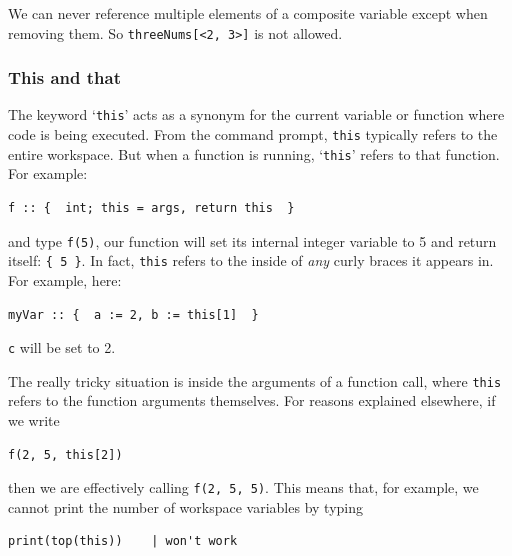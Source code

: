 \documentclass{article}
\newenvironment{code}{
       \begin{list}{}{
               \setlength{\leftmargin}{.4in}
               \setlength{\rightmargin}{0in}
               \setlength{\topsep}{.2in}
       }
       \small
       \item[] }
       { \end{list}   }
\begin{document}
We can never reference multiple elements of a composite variable except when removing them.  So \verb#threeNums[<2, 3>]# is not allowed.



\subsubsection{This and that}

The keyword `\verb#this#' acts as a synonym for the current variable or function where code is being executed.  From the command prompt, \verb#this# typically refers to the entire workspace.  But when a function is running, `\verb#this#' refers to that function.  For example:

\begin{code} \begin{verbatim}
f :: {  int; this = args, return this  }
\end{verbatim} \end{code}

\noindent and type \verb#f(5)#, our function will set its internal integer variable to 5 and return itself:  \verb#{ 5 }#.  In fact, \verb#this# refers to the inside of \emph{any} curly braces it appears in.  For example, here:

\begin{code} \begin{verbatim}
myVar :: {  a := 2, b := this[1]  }
\end{verbatim} \end{code}

\noindent \verb#c# will be set to 2.

The really tricky situation is inside the arguments of a function call, where \verb#this# refers to the function arguments themselves.  For reasons explained elsewhere, if we write

\begin{code} \begin{verbatim}
f(2, 5, this[2])
\end{verbatim} \end{code}

\noindent then we are effectively calling \verb#f(2, 5, 5)#.  This means that, for example, we cannot print the number of workspace variables by typing

\begin{code} \begin{verbatim}
print(top(this))    | won't work
\end{verbatim} \end{code}
\end{document}
